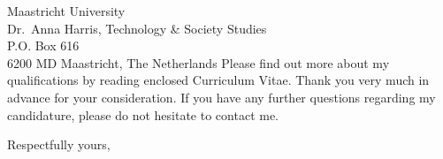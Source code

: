 \documentclass[10pt,a4paper]{letter}
\begin{document}
\begin{letter}{Maastricht University \\ Dr.~Anna Harris, Technology \& Society Studies \\ P.O. Box 616 \\ 6200 MD Maastricht, The Netherlands}
Please find out more about my qualifications by reading enclosed Curriculum Vitae. Thank you very much in advance for your consideration. If you have any further questions regarding my candidature, please do not hesitate to contact me.


\closing{Respectfully yours,\\
 \\
}
 
\end{letter} 
\end{document}
